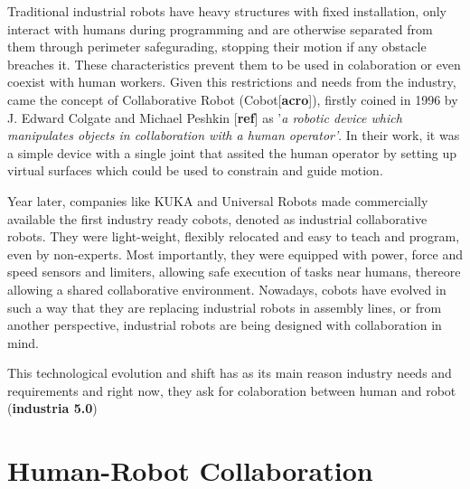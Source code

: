 \par Traditional industrial robots have heavy structures with fixed installation, only interact with humans during programming and are otherwise separated from them through perimeter safegurading, stopping their motion if any obstacle breaches it. These characteristics prevent them to be used in colaboration or even coexist with human workers. Given this restrictions and needs from the industry, came the concept of Collaborative Robot (Cobot[\textbf{acro}]), firstly coined in 1996 by J. Edward Colgate and Michael Peshkin [\textbf{ref}] as '\textit{a robotic device which manipulates objects in collaboration with a human operator'}. In their work, it was a simple device with a single joint that assited the human operator by setting up virtual surfaces which could be used to constrain and guide motion.


\par Year later, companies like KUKA and Universal Robots made commercially available the first industry ready cobots, denoted as industrial collaborative robots. They were light-weight, flexibly relocated and easy to teach and program, even by non-experts. Most importantly, they were equipped with power, force and speed sensors and limiters, allowing safe execution of tasks near humans, thereore allowing a shared collaborative environment. 
% 
Nowadays, cobots have evolved in such a way that they are replacing industrial robots in assembly lines, or from another perspective, industrial robots are being designed with collaboration in mind.

\par This technological evolution and shift has as its main reason industry needs and requirements and right now, they ask for colaboration between human and robot (\textbf{industria 5.0})



\section{Human-Robot Collaboration}


